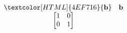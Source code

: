 \documentclass[preview]{standalone}
\begin{document}
\begin{align*}
\begin{array}{c}\begin{matrix}\textcolor[HTML]{4EF716}{\mathbf{b}} & \mathbf{b} \end{matrix} \\\begin{bmatrix} 1 & 0 \\0 & 1 \end{bmatrix} \end{array}
\end{align*}
\end{document}

